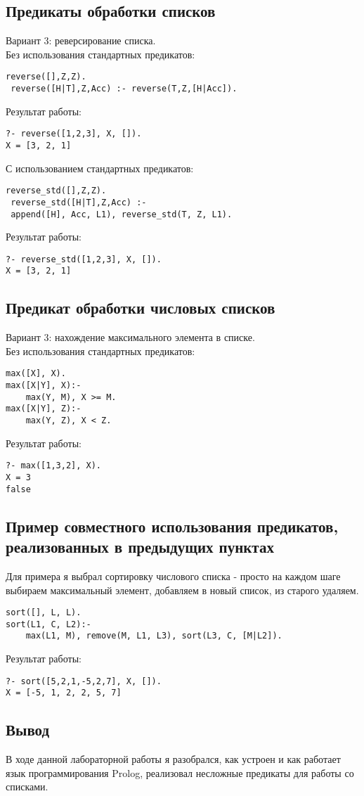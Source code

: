 \documentclass[12pt]{article}
\begin{document}
\subsection*{Предикаты обработки списков}
Вариант 3: реверсирование списка.\\
Без использования стандартных предикатов:
\begin{lstlisting}
reverse([],Z,Z).
 reverse([H|T],Z,Acc) :- reverse(T,Z,[H|Acc]).
\end{lstlisting}
Результат работы:
\begin{lstlisting}
?- reverse([1,2,3], X, []).
X = [3, 2, 1]
\end{lstlisting}
С использованием стандартных предикатов:
\begin{lstlisting}
reverse_std([],Z,Z).
 reverse_std([H|T],Z,Acc) :- 
 append([H], Acc, L1), reverse_std(T, Z, L1).
\end{lstlisting}
Результат работы:
\begin{lstlisting}
?- reverse_std([1,2,3], X, []).
X = [3, 2, 1]
\end{lstlisting}

\subsection*{Предикат обработки числовых списков}
Вариант 3: нахождение максимального элемента в списке.\\
Без использования стандартных предикатов:
\begin{lstlisting}
max([X], X).
max([X|Y], X):-
    max(Y, M), X >= M.
max([X|Y], Z):-
    max(Y, Z), X < Z.
\end{lstlisting}
Результат работы:
\begin{lstlisting}
?- max([1,3,2], X).
X = 3
false
\end{lstlisting}

\subsection*{Пример совместного использования предикатов, реализованных в предыдущих пунктах}
Для примера я выбрал сортировку числового списка - просто на каждом шаге выбираем максимальный элемент, добавляем в новый список, из старого удаляем.\\
\begin{lstlisting}
sort([], L, L).
sort(L1, C, L2):-
    max(L1, M), remove(M, L1, L3), sort(L3, C, [M|L2]).
\end{lstlisting}
Результат работы:
\begin{lstlisting}
?- sort([5,2,1,-5,2,7], X, []).
X = [-5, 1, 2, 2, 5, 7]
\end{lstlisting}

\subsection*{Вывод}
В ходе данной лабораторной работы я разобрался, как устроен и как работает язык программирования Prolog, реализовал несложные предикаты для работы со
списками. 
\end{document}
